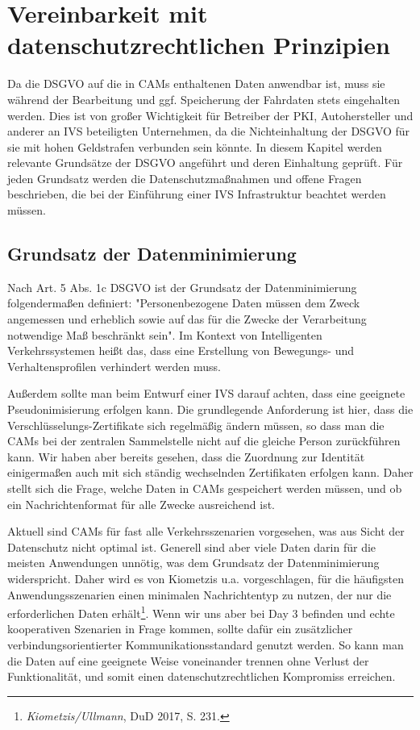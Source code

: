 \section{Vereinbarkeit mit datenschutzrechtlichen Prinzipien}
\label{ch:ThirdContentSection}

Da die DSGVO auf die in CAMs enthaltenen Daten anwendbar ist, muss sie während der Bearbeitung und ggf. Speicherung der Fahrdaten stets eingehalten werden. Dies ist von großer Wichtigkeit für Betreiber der PKI, Autohersteller und anderer an IVS beteiligten Unternehmen, da die Nichteinhaltung der DSGVO für sie mit hohen Geldstrafen verbunden sein könnte. In diesem Kapitel werden relevante Grundsätze der DSGVO angeführt und deren Einhaltung geprüft. Für jeden Grundsatz werden die Datenschutzmaßnahmen und offene Fragen beschrieben, die bei der Einführung einer IVS Infrastruktur beachtet werden müssen. 

\subsection{Grundsatz der Datenminimierung}

Nach Art. 5 Abs. 1c DSGVO ist der Grundsatz der Datenminimierung folgendermaßen definiert: "Personenbezogene Daten müssen dem Zweck angemessen und erheblich sowie auf das für die Zwecke der Verarbeitung notwendige Maß beschränkt sein". Im Kontext von Intelligenten Verkehrssystemen heißt das, dass eine Erstellung von Bewegungs- und Verhaltensprofilen verhindert werden muss. 



Außerdem sollte man beim Entwurf einer IVS darauf achten, dass eine geeignete Pseudonimisierung erfolgen kann. Die grundlegende Anforderung ist hier, dass die Verschlüsselungs-Zertifikate sich regelmäßig ändern müssen, so dass man die CAMs bei der zentralen Sammelstelle nicht auf die gleiche Person zurückführen kann. Wir haben aber bereits gesehen, dass die Zuordnung zur Identität einigermaßen auch mit sich ständig wechselnden Zertifikaten erfolgen kann. Daher stellt sich die Frage, welche Daten in CAMs gespeichert werden müssen, und ob ein Nachrichtenformat für alle Zwecke ausreichend ist.

Aktuell sind CAMs für fast alle Verkehrsszenarien vorgesehen, was aus Sicht der Datenschutz nicht optimal ist. Generell sind aber viele Daten darin für die meisten Anwendungen unnötig, was dem Grundsatz der Datenminimierung widerspricht. Daher wird es von Kiometzis u.a. vorgeschlagen, für die häufigsten Anwendungsszenarien einen minimalen Nachrichtentyp zu nutzen, der nur die erforderlichen Daten erhält\footnote{\emph{Kiometzis/Ullmann}, DuD 2017, S. 231.}. Wenn wir uns aber bei Day 3 befinden und echte kooperativen Szenarien in Frage kommen, sollte dafür ein zusätzlicher verbindungsorientierter Kommunikationsstandard genutzt werden. So kann man die Daten auf eine geeignete Weise voneinander trennen ohne Verlust der Funktionalität, und somit einen datenschutzrechtlichen Kompromiss erreichen.


